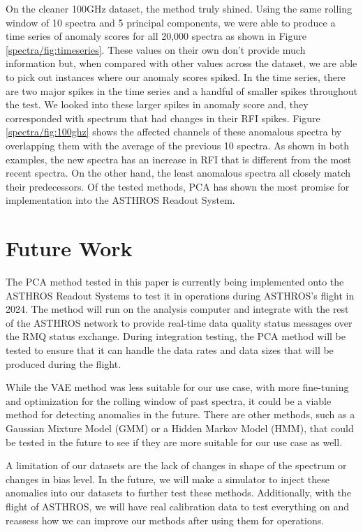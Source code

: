 On the cleaner 100GHz dataset, the method truly shined.
Using the same rolling window of 10 spectra and 5 principal components, we were able to produce a time series of anomaly scores for all 20,000 spectra as shown in Figure \ref{spectra/fig:timeseries}.
These values on their own don't provide much information but, when compared with other values across the dataset, we are able to pick out instances where our anomaly scores spiked. 
In the time series, there are two major spikes in the time series and a handful of smaller spikes throughout the test. 
We looked into these larger spikes in anomaly score and, they corresponded with spectrum that had changes in their RFI spikes.
Figure \ref{spectra/fig:100ghz} shows the affected channels of these anomalous spectra by overlapping them with the average of the previous 10 spectra. 
As shown in both examples, the new spectra has an increase in RFI that is different from the most recent spectra. 
On the other hand, the least anomalous spectra all closely match their predecessors. 
Of the tested methods, PCA has shown the most promise for implementation into the ASTHROS Readout System. 

\section{Future Work}
\label{spectra/sec:future}
The PCA method tested in this paper is currently being implemented onto the ASTHROS Readout Systems to test it in operations during ASTHROS's flight in 2024. 
The method will run on the analysis computer and integrate with the rest of the ASTHROS network to provide real-time data quality status messages over the RMQ status exchange.
During integration testing, the PCA method will be tested to ensure that it can handle the data rates and data sizes that will be produced during the flight. 

While the VAE method was less suitable for our use case, with more fine-tuning and optimization for the rolling window of past spectra, it could be a viable method for detecting anomalies in the future.
There are other methods, such as a Gaussian Mixture Model (GMM) or a Hidden Markov Model (HMM), that could be tested in the future to see if they are more suitable for our use case as well.

A limitation of our datasets are the lack of changes in shape of the spectrum or changes in bias level. 
In the future, we will make a simulator to inject these anomalies into our datasets to further test these methods. 
Additionally, with the flight of ASTHROS, we will have real calibration data to test everything on and reassess how we can improve our methods after using them for operations.